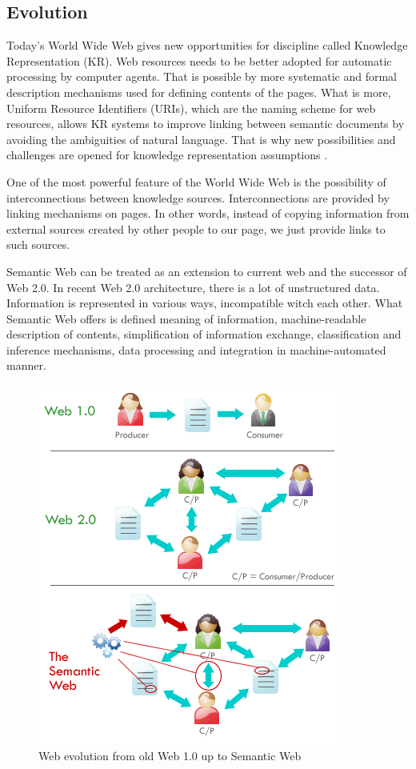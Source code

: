 \newpage

\subsection{Evolution}
\label{sub:semWebEvolution}

Today's World Wide Web gives new opportunities for discipline called Knowledge Representation (KR). Web resources needs to be better adopted for automatic processing by computer agents. That is possible by more systematic and formal description mechanisms used for defining contents of the pages. What is more, Uniform Resource Identifiers (URIs), which are the naming scheme for web resources, allows KR systems to improve linking between semantic documents by avoiding the ambiguities of natural language. That is why new possibilities and challenges are opened for knowledge representation assumptions \cite{HLP08}.

One of the most powerful feature of the World Wide Web is the possibility of interconnections between knowledge sources. Interconnections are provided by linking mechanisms on pages. In other words, instead of copying information from external sources created by other people to our page, we just provide links to such sources.

Semantic Web can be treated as an extension to current web and the successor of Web 2.0. In recent Web 2.0 architecture, there is a lot of unstructured data. Information is represented in various ways, incompatible witch each other. What Semantic Web offers is defined meaning of information, machine-readable description of contents, simplification of information exchange, classification and inference mechanisms, data processing and integration in machine-automated manner. 

\medskip

\begin{figure}[htp]
\centering
\includegraphics[scale=0.65]{images/chapter2/WebEvolution}
\caption{Web evolution from old Web 1.0 up to Semantic Web \cite{PWGB}}
\label{fig:webEvolution}
\end{figure}

